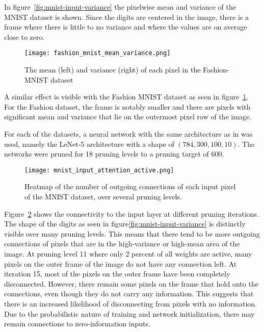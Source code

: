 In figure~\ref{fig:mnist-input-variance} the pixelwise mean and variance of the MNIST dataset is shown.
Since the digits are centered in the image, there is a frame where there is little to no variance and where the values are on average close to zero.
\begin{figure}[ht] %
    \centering \texttt{[image: fashion\_mnist\_mean\_variance.png]}
    \caption[Mean and Variance Fashion-MNIST]{
        The mean (left) and variance (right) of each pixel in the Fashion-MNIST dataset
        }\label{fig:fashion-input-variance}
\end{figure}

A similar effect is visible with the Fashion MNIST dataset as seen in figure~\ref{fig:fashion-input-variance}.
For the Fashion dataset, the frame is notably smaller and there are pixels with significant mean and variance that lie on the outermost pixel row of the image.

For each of the datasets, a neural network with the same architecture as in \autocite{LTH} was used, namely the LeNet-5 architecture with a shape of $(784,300,100,10)$.
The networks were pruned for 18 pruning levels to a pruning target of {$600$}.

\begin{figure}[ht] %
    \centering\texttt{[image: mnist\_input\_attention\_active.png]}
    \caption[Pixel connectivity MNIST]{
        Heatmap of the number of outgoing connections of each input pixel of the MNIST dataset, over several pruning levels.
        }\label{fig:mnist-heatmap}
\end{figure}

Figure~\ref{fig:mnist-heatmap} shows the connectivity to the input layer at different pruning iterations.
The shape of the digits as seen in figure\ref{fig:mnist-input-variance} is distinctly visible over many pruning levels.
This means that there tend to be more outgoing connections of pixels that are in the high-variance or high-mean area of the image.
At pruning level 11 where only 2 percent of all weights are active, many pixels on the outer frame of the image do not have any connection left.
At iteration 15, most of the pixels on the outer frame have been completely disconnected.
However, there remain some pixels on the frame that hold onto the connections, even though they do not carry any information.
This suggests that there is an increased likelihood of disconnecting from pixels with no information.
Due to the probabilistic nature of training and network initialization, there may remain connections to zero-information inputs.

